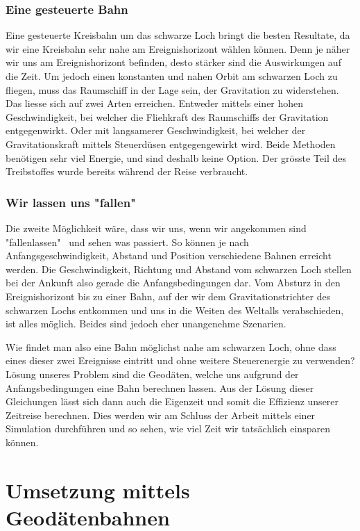 \begin{refsection}
	\subsubsection{Eine gesteuerte Bahn}
	Eine gesteuerte Kreisbahn um das schwarze Loch bringt die besten Resultate, da wir eine Kreisbahn sehr nahe am Ereignishorizont wählen können. Denn je näher wir uns am Ereignishorizont befinden, desto stärker sind die Auswirkungen auf die Zeit. 
	Um jedoch einen konstanten und nahen Orbit am schwarzen Loch zu fliegen, muss das Raumschiff in der Lage sein, der Gravitation zu widerstehen. Das liesse sich auf zwei Arten erreichen. Entweder mittels einer hohen Geschwindigkeit, bei welcher die Fliehkraft des Raumschiffs der Gravitation entgegenwirkt. Oder mit langsamerer Geschwindigkeit, bei welcher der Gravitationskraft mittels Steuerdüsen entgegengewirkt wird. 
	Beide Methoden benötigen sehr viel Energie, und sind deshalb keine Option. Der grösste Teil des Treibstoffes wurde bereits während der Reise  verbraucht.
	\subsubsection{Wir lassen uns "fallen"}
	
	Die zweite Möglichkeit wäre, dass wir uns, wenn wir angekommen sind "fallenlassen" \ und sehen was passiert. So können je nach Anfangsgeschwindigkeit, Abstand und Position verschiedene Bahnen erreicht werden. Die Geschwindigkeit, Richtung und Abstand vom schwarzen Loch stellen bei der Ankunft also gerade die Anfangsbedingungen dar. Vom Absturz in den Ereignishorizont bis zu einer Bahn, auf der wir dem Gravitationstrichter des schwarzen Lochs entkommen und uns in die Weiten des Weltalls verabschieden, ist alles möglich. Beides sind jedoch eher unangenehme Szenarien. 
	
	Wie findet man also eine Bahn möglichst nahe am schwarzen Loch, ohne dass eines dieser zwei Ereignisse eintritt und ohne weitere Steuerenergie zu verwenden?
	Lösung unseres Problem sind die Geodäten, welche uns aufgrund der Anfangsbedingungen eine Bahn berechnen lassen. Aus der Lösung dieser Gleichungen lässt sich dann auch die Eigenzeit und somit die Effizienz unserer Zeitreise berechnen. Dies werden wir am Schluss der Arbeit mittels einer Simulation durchführen und so sehen, wie viel Zeit wir tatsächlich einsparen können.
	
	\section{Umsetzung mittels Geodätenbahnen}
	

\end{refsection}
